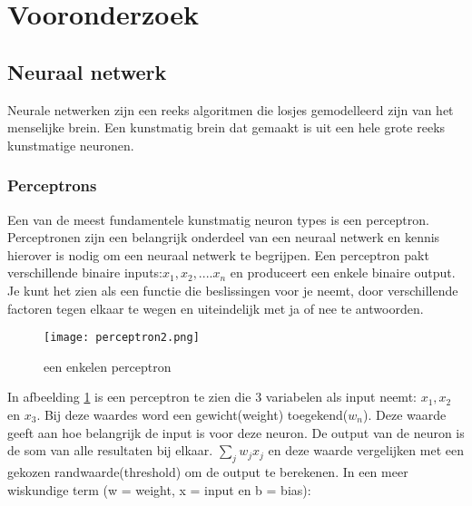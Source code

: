 \section{Vooronderzoek}

\subsection{Neuraal netwerk}
Neurale netwerken zijn een reeks algoritmen die losjes gemodelleerd zijn van het menselijke brein. Een kunstmatig brein dat gemaakt is uit een hele grote reeks kunstmatige neuronen.

\subsubsection{Perceptrons}
Een van de meest fundamentele kunstmatig neuron types is een perceptron.\cite{Perceptron1} Perceptronen zijn een belangrijk onderdeel van een neuraal netwerk en kennis hierover is nodig om een neuraal netwerk te begrijpen. Een perceptron pakt verschillende binaire inputs:$x_{1}, x_{2},....x_{n}$ en produceert een enkele binaire output. Je kunt het zien als een functie die beslissingen voor je neemt, door verschillende factoren tegen elkaar te wegen en uiteindelijk met ja of nee te antwoorden.
\begin{figure}[h!]
\centering
\texttt{[image: perceptron2.png]}
\caption{een enkelen perceptron}
\label{peceptron2}
\end{figure}
\linebreak
In afbeelding \ref{peceptron2} is een perceptron te zien die 3 variabelen als input neemt: $x_{1}, x_{2}$ en $x_{3}.$ Bij  deze waardes word een gewicht(weight) toegekend($w_{n}$). Deze waarde geeft aan hoe belangrijk de input is voor deze neuron. De output van de neuron is de som van alle resultaten bij elkaar. $\sum_{j}w_{j}x_{j}$ en deze waarde vergelijken met een gekozen randwaarde(threshold) om de output te berekenen. In een meer wiskundige term (w = weight, x = input en b = bias):

